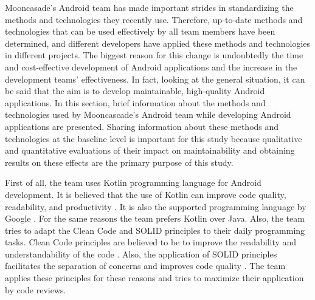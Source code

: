 Mooncasade's Android team has made important strides in standardizing the methods and technologies they recently use. Therefore, up-to-date methods and technologies that can be used effectively by all team members have been determined, and different developers have applied these methods and technologies in different projects. The biggest reason for this change is undoubtedly the time and cost-effective development of Android applications and the increase in the development teams' effectiveness. In fact, looking at the general situation, it can be said that the aim is to develop maintainable, high-quality Android applications. In this section, brief information about the methods and technologies used by Mooncascade's Android team while developing Android applications are presented. Sharing information about these methods and technologies at the baseline level is important for this study because qualitative and quantitative evaluations of their impact on maintainability and obtaining results on these effects are the primary purpose of this study.

First of all, the team uses Kotlin programming language for Android development. It is believed that the use of Kotlin can improve code quality, readability, and productivity \cite{44}. It is also the supported programming language by Google \cite{43}. For the same reasons the team prefers Kotlin over Java. Also, the team tries to adapt the Clean Code and SOLID principles to their daily programming tasks. Clean Code principles are believed to be to improve the readability and understandability of the code \cite{46}. Also, the application of SOLID principles facilitates the separation of concerns and improves code quality \cite{26}. The team applies these principles for these reasons and tries to maximize their application by code reviews.

